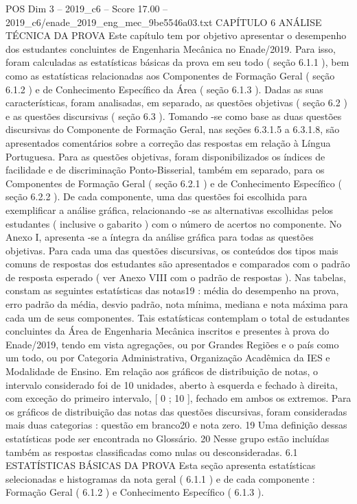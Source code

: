 \begin{textsample}{POS Dim 3 – 2019\_c6 – Score 17.00 – 2019\_c6/enade\_2019\_eng\_mec\_9be5546a03.txt}  \label{ex:f3_pos_008}
CAPÍTULO 6 ANÁLISE TÉCNICA DA PROVA Este capítulo tem por objetivo apresentar o desempenho dos estudantes concluintes de Engenharia Mecânica no Enade/2019.
Para isso, foram calculadas as estatísticas básicas da prova em seu todo ( seção 6.1.1 ), bem como as estatísticas relacionadas aos Componentes de Formação Geral ( seção 6.1.2 ) e de Conhecimento Específico da Área ( seção 6.1.3 ).
Dadas as suas características, foram analisadas, em separado, as questões objetivas ( seção 6.2 ) e as questões discursivas ( seção 6.3 ).
Tomando -se como base as duas questões discursivas do Componente de Formação Geral, nas seções 6.3.1.5 a 6.3.1.8, são apresentados comentários sobre a correção das respostas em relação à Língua Portuguesa.
Para as questões objetivas, foram disponibilizados os índices de facilidade e de discriminação Ponto-Bisserial, também em separado, para os Componentes de Formação Geral ( seção 6.2.1 ) e de Conhecimento Específico ( seção 6.2.2 ).
De cada componente, uma das questões foi escolhida para exemplificar a análise gráfica, relacionando -se as alternativas escolhidas pelos estudantes ( inclusive o gabarito ) com o número de acertos no componente.
No Anexo I, apresenta -se a íntegra da análise gráfica para todas as questões objetivas.
Para cada uma das questões discursivas, os conteúdos dos tipos mais comuns de respostas dos estudantes são apresentados e comparados com o padrão de resposta esperado ( ver Anexo VIII com o padrão de respostas ).
Nas tabelas, constam as seguintes estatísticas das notas19 : média do desempenho na prova, erro padrão da média, desvio padrão, nota mínima, mediana e nota máxima para cada um de seus componentes.
Tais estatísticas contemplam o total de estudantes concluintes da Área de Engenharia Mecânica inscritos e presentes à prova do Enade/2019, tendo em vista agregações, ou por Grandes Regiões e o país como um todo, ou por Categoria Administrativa, Organização Acadêmica da IES e Modalidade de Ensino.
Em relação aos gráficos de distribuição de notas, o intervalo considerado foi de 10 unidades, aberto à esquerda e fechado à direita, com exceção do primeiro intervalo, [ 0 ; 10 ], fechado em ambos os extremos.
Para os gráficos de distribuição das notas das questões discursivas, foram consideradas mais duas categorias : questão em branco20 e nota zero. 19 Uma definição dessas estatísticas pode ser encontrada no Glossário. 20 Nesse grupo estão incluídas também as respostas classificadas como nulas ou desconsideradas. 6.1 ESTATÍSTICAS BÁSICAS DA PROVA Esta seção apresenta estatísticas selecionadas e histogramas da nota geral ( 6.1.1 ) e de cada componente : Formação Geral ( 6.1.2 ) e Conhecimento Específico ( 6.1.3 ).

\end{textsample}
